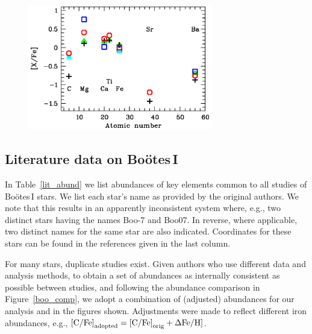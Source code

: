 \documentclass[]{emulateapj}
\begin{document}
\begin{figure}[!t]
 \begin{center}
  \includegraphics[clip=true,width=8cm,bbllx=200, bblly=565, bburx=500,
   bbury=767]{boo127_comparison.ps} 
 \end{center}
\end{figure}



\subsection{Literature data on Bo\"otes\,I}

In Table~\ref{lit_abund} we list abundances of key elements common to
all studies of Bo\"otes\,I stars. We list each star's name as provided
by the original authors. We note that this results in an apparently
inconsistent system where, e.g., two distinct stars having the names
Boo-7 and Boo07. In reverse, where applicable, two distinct names for
the same star are also indicated. Coordinates for these stars can be
found in the references given in the last column.

For many stars, duplicate studies exist. Given authors who use
different data and analysis methods, to obtain a set of abundances as
internally consistent as possible between studies, and following the abundance
comparison in Figure~\ref{boo_comp}, we adopt a combination of
(adjusted) abundances for our analysis and in the figures
shown. Adjustments were made to reflect different iron abundances,
e.g., $\mbox{[C/Fe]}_{\rm adopted} = \mbox{[C/Fe]}_{\rm orig} +
\Delta\mbox{Fe/H]}$.
\end{document}
